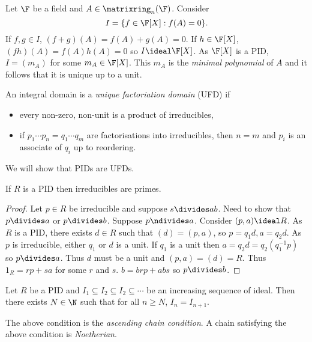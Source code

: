 \documentclass[a4paper]{article}
\theoremstyle{definition}
\begin{document}
\begin{eg}
  Let \(\F\) be a field and \(A \in \matrixring_n(\F)\). Consider
  \[
    I = \{f \in \F[X]: f(A) = 0\}.
  \]
  If \(f , g\in I\), \((f + g)(A) = f(A) + g(A) = 0\). If \(h \in \F[X]\), \((fh)(A) = f(A)h(A) = 0\) so \(I \ideal \F[X]\). As \(\F[X]\) is a PID, \(I = (m_A)\) for some \(m_A \in \F[X]\). This \(m_A\) is the \emph{minimal polynomial} of \(A\) and it follows that it is unique up to a unit.
\end{eg}

\begin{definition}
  An integral domain is a \emph{unique factoriation domain} (UFD) if
  \begin{itemize}
  \item every non-zero, non-unit is a product of irreducibles,
  \item if \(p_1 \cdots p_n = q_1 \cdots q_m\) are factorisations into irreducibles, then \(n = m\) and \(p_i\) is an associate of \(q_i\) up to reordering.
  \end{itemize}
\end{definition}

We will show that PIDs are UFDs.

\begin{lemma}
  If \(R\) is a PID then irreducibles are primes.
\end{lemma}

\begin{proof}
  Let \(p \in R\) be irreducible and suppose \(s \divides ab\). Need to show that \(p \divides a\) or \(p \divides b\). Suppose \(p \ndivides a\). Consider \((p, a) \ideal R\). As \(R\) is a PID, there exists \(d \in R\) such that \((d) = (p, a)\), so \(p = q_1d, a = q_2d\). As \(p\) is irreducible, either \(q_1\) or \(d\) is a unit. If \(q_1\) is a unit then \(a = q_2d = q_2(q_1^{-1}p)\) so \(p \divides a\). Thus \(d\) must be a unit and \((p, a) = (d) = R\). Thus \(1_R = rp + sa\) for some \(r\) and \(s\). \(b = brp + abs\) so \(p \divides b\).
\end{proof}

\begin{lemma}
  Let \(R\) be a PID and \(I_1 \subseteq I_2 \subseteq I_2 \subseteq \cdots\) be an increasing sequence of ideal. Then there exists \(N \in \N\) such that for all \(n \geq N\), \(I_n = I_{n + 1}\).
\end{lemma}

\begin{definition}[Noetherian]
  The above condition is the \emph{ascending chain condition}. A chain satisfying the above condition is \emph{Noetherian}.
\end{definition}
\end{document}
